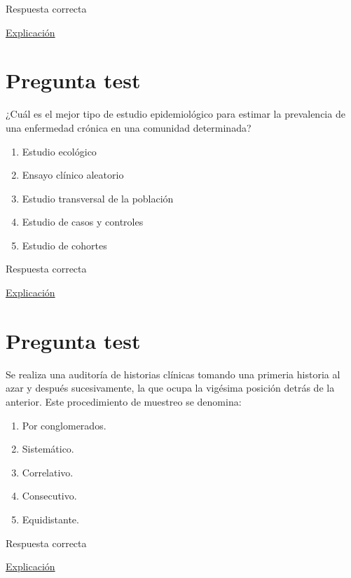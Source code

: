 \documentclass[
]{book}
\providecommand{\tightlist}{%
  \setlength{\itemsep}{0pt}\setlength{\parskip}{0pt}}
\begin{document}
Respuesta correcta

\href{https://1fjmanzano.github.io/bioestadistica/tipos-de-variables.html}{Explicación}

\hypertarget{pregunta-test-2}{%
\section{Pregunta test}\label{pregunta-test-2}}

¿Cuál es el mejor tipo de estudio epidemiológico para estimar la prevalencia de una enfermedad crónica en una comunidad determinada?

\begin{enumerate}
\def\labelenumi{\alph{enumi})}
\tightlist
\item
  Estudio ecológico
\item
  Ensayo clínico aleatorio
\item
  Estudio transversal de la población
\item
  Estudio de casos y controles
\item
  Estudio de cohortes
\end{enumerate}

Respuesta correcta

\href{https://escuelitamedica.com/2019/02/03/tipos-de-estudios-epidemiologicos-preguntas/}{Explicación}

\hypertarget{pregunta-test-3}{%
\section{Pregunta test}\label{pregunta-test-3}}

Se realiza una auditoría de historias clínicas tomando una primeria historia al azar y después sucesivamente, la que ocupa la vigésima posición detrás de la anterior. Este procedimiento de muestreo se denomina:

\begin{enumerate}
\def\labelenumi{\alph{enumi})}
\tightlist
\item
  Por conglomerados.
\item
  Sistemático.
\item
  Correlativo.
\item
  Consecutivo.
\item
  Equidistante.
\end{enumerate}

Respuesta correcta

\href{https://1fjmanzano.github.io/bioestadistica/me\%CC\%81todos-de-muestreo.html}{Explicación}
\end{document}
